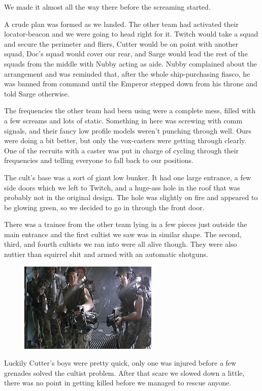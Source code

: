 We made it almost all the way there before the screaming started.

A crude plan was formed as we landed. 
The other team had activated their locator-beacon and we were going to head right for it. 
Twitch would take a squad and secure the perimeter and fliers, Cutter would be on point with another squad, Doc’s squad would cover our rear, and Sarge would lead the rest of the squads from the middle with Nubby acting as aide. 
Nubby complained about the arrangement and was reminded that, after the whole ship-purchasing fiasco, he was banned from command until the Emperor stepped down from his throne and told Sarge otherwise.

The frequencies the other team had been using were a complete mess, filled with a few screams and lots of static. 
Something in here was screwing with comm signals, and their fancy low profile models weren’t punching through well. 
Ours were doing a bit better, but only the vox-casters were getting through clearly. 
One of the recruits with a caster was put in charge of cycling through their frequencies and telling everyone to fall back to our positions. 


The cult’s base was a sort of giant low bunker. 
It had one large entrance, a few side doors which we left to Twitch, and a huge-ass hole in the roof that was probably not in the original design. 
The hole was slightly on fire and appeared to be glowing green, so we decided to go in through the front door.

There was a trainee from the other team lying in a few pieces just outside the main entrance and the first cultist we saw was in similar shape. 
The second, third, and fourth cultists we ran into were all alive though. 
They were also nuttier than squirrel shit and armed with an automatic shotguns.

\begin{figure}
	\begin{center}
		\includegraphics[width=\figwidth]{pics/8/38.png}
	\end{center}
\end{figure}
Luckily Cutter’s boys were pretty quick, only one was injured before a few grenades solved the cultist problem. 
After that scare we slowed down a little, there was no point in getting killed before we managed to rescue anyone.


